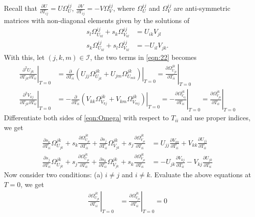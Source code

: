 \documentclass[10pt]{article}
\begin{document}
Recall that $\frac{\partial U}{\partial T_{ij}} = U\Omega_U^{ij}$, $\frac{\partial V}{\partial T_{ij}} = -V\Omega_V^{ij}$, where $\Omega_U^{ij}$ and $\Omega_V^{ij}$ are anti-symmetric matrices with non-diagonal elements given by the solutions of
\begin{align} \label{eqn:Omega}
	s_l\Omega_{U_{kl}}^{ij} + s_k\Omega_{V_{kl}}^{ij} &= U_{ik}V_{jl} \nonumber \\
	s_k\Omega_{U_{kl}}^{ij} + s_l\Omega_{V_{kl}}^{ij} &= -U_{il}V_{jk}.
\end{align}
With this, let $(j,k,m)\in\mathcal{I}$, the two terms in \eqref{eqn:22} becomes
\begin{align}
	\left. \frac{\partial^2 U_{jk}}{\partial T_{jk} \partial T_{ii}} \right|_{T=0} &= \frac{\partial}{\partial T_{ii}} \left.\left( U_{jj}\Omega_{U_{jk}}^{jk} + U_{jm}\Omega_{U_{mk}}^{jk} \right)\right|_{T=0} = \left.\frac{\partial \Omega_{U_{jk}}^{jk}}{\partial T_{ii}}\right|_{T=0} \nonumber \\
	\left. \frac{\partial^2 V_{kj}}{\partial T_{jk} \partial T_{ii}} \right|_{T=0} &= -\frac{\partial}{\partial T_{ii}} \left.\left( V_{kk}\Omega_{V_{kj}}^{jk} + V_{km}\Omega_{V_{mj}}^{jk} \right)\right|_{T=0} = -\left.\frac{\partial \Omega_{V_{kj}}^{jk}}{\partial T_{ii}}\right|_{T=0} = \left.\frac{\partial \Omega_{V_{jk}}^{jk}}{\partial T_{ii}}\right|_{T=0}
\end{align}
Differentiate both sides of \eqref{eqn:Omega} with respect to $T_{ii}$ and use proper indices, we get
\begin{align} \label{eqn:dUVdT}
	\frac{\partial s_k}{\partial T_{ii}}\Omega_{U_{jk}}^{jk} +  s_k\frac{\partial \Omega_{U_{jk}}^{jk}}{\partial T_{ii}} + \frac{\partial s_j}{\partial T_{ii}}\Omega_{V_{jk}}^{jk} + s_j\frac{\partial \Omega_{V_{jk}}^{jk}}{\partial T_{ii}} &= U_{jj}\frac{\partial V_{kk}}{\partial T_{ii}} + V_{kk}\frac{\partial U_{jj}}{\partial T_{ii}} \nonumber \\
	\frac{\partial s_j}{\partial T_{ii}}\Omega_{U_{jk}}^{jk} +  s_j\frac{\partial \Omega_{U_{jk}}^{jk}}{\partial T_{ii}} + \frac{\partial s_k}{\partial T_{ii}}\Omega_{V_{jk}}^{jk} + s_k\frac{\partial \Omega_{V_{jk}}^{jk}}{\partial T_{ii}} &= -U_{jk}\frac{\partial V_{kj}}{\partial T_{ii}} - V_{kj}\frac{\partial U_{jk}}{\partial T_{ii}}
\end{align}
Now consider two conditions: (a) $i\neq j$ and $i\neq k$.
Evaluate the above equations at $T=0$, we get
\begin{align}
	\left.\frac{\partial \Omega_{U_{jk}}^{jk}}{\partial T_{ii}}\right|_{T=0} &= \left.\frac{\partial \Omega_{V_{jk}}^{jk}}{\partial T_{ii}}\right|_{T=0} = 0 
\end{align}
\end{document}

